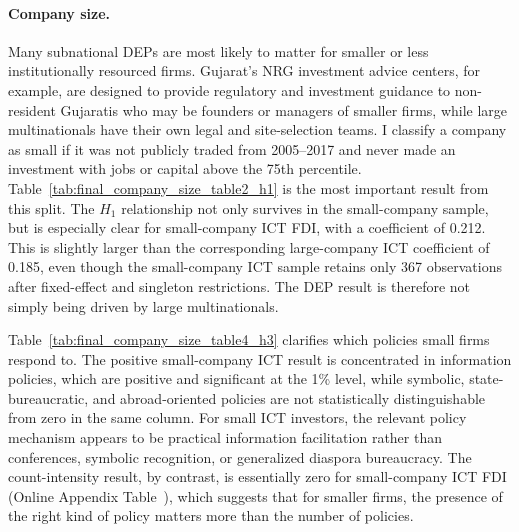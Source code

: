 \documentclass[12pt]{article}
\begin{document}
\paragraph{Company size.} Many subnational DEPs are most likely to matter for smaller or less institutionally resourced firms. Gujarat's NRG investment advice centers, for example, are designed to provide regulatory and investment guidance to non-resident Gujaratis who may be founders or managers of smaller firms, while large multinationals have their own legal and site-selection teams. I classify a company as small if it was not publicly traded from 2005--2017 and never made an investment with jobs or capital above the 75th percentile. Table~\ref{tab:final_company_size_table2_h1} is the most important result from this split. The $H_1$ relationship not only survives in the small-company sample, but is especially clear for small-company ICT FDI, with a coefficient of 0.212. This is slightly larger than the corresponding large-company ICT coefficient of 0.185, even though the small-company ICT sample retains only 367 observations after fixed-effect and singleton restrictions. The DEP result is therefore not simply being driven by large multinationals.



Table~\ref{tab:final_company_size_table4_h3} clarifies which policies small firms respond to. The positive small-company ICT result is concentrated in information policies, which are positive and significant at the 1\% level, while symbolic, state-bureaucratic, and abroad-oriented policies are not statistically distinguishable from zero in the same column. For small ICT investors, the relevant policy mechanism appears to be practical information facilitation rather than conferences, symbolic recognition, or generalized diaspora bureaucracy. The count-intensity result, by contrast, is essentially zero for small-company ICT FDI (Online Appendix Table~), which suggests that for smaller firms, the presence of the right kind of policy matters more than the number of policies.


\end{document}
